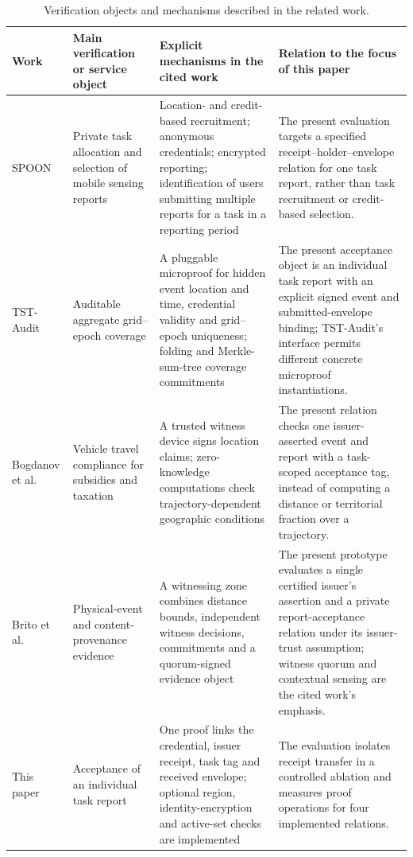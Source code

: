 \documentclass[pdflatex,iicol,sn-mathphys-num]{sn-jnl}
\begin{document}
\begin{table}[t]
\centering\small
\caption{Verification objects and mechanisms described in the related work.}\label{tab:comparison-context}
\begin{tabularx}{\textwidth}{@{}p{}p{}p{}X@{}}
\toprule
Work & Main verification or service object & Explicit mechanisms in the cited work & Relation to the focus of this paper \\\midrule
SPOON~\citep{Ni2020SPOON} & Private task allocation and selection of mobile sensing reports & Location- and credit-based recruitment; anonymous credentials; encrypted reporting; identification of users submitting multiple reports for a task in a reporting period & The present evaluation targets a specified receipt--holder--envelope relation for one task report, rather than task recruitment or credit-based selection. \\
TST-Audit~\citep{He2026TSTAudit} & Auditable aggregate grid--epoch coverage & A pluggable microproof for hidden event location and time, credential validity and grid--epoch uniqueness; folding and Merkle-sum-tree coverage commitments & The present acceptance object is an individual task report with an explicit signed event and submitted-envelope binding; TST-Audit's interface permits different concrete microproof instantiations. \\
Bogdanov et al.~\citep{Bogdanov2025VehiclePolicy} & Vehicle travel compliance for subsidies and taxation & A trusted witness device signs location claims; zero-knowledge computations check trajectory-dependent geographic conditions & The present relation checks one issuer-asserted event and report with a task-scoped acceptance tag, instead of computing a distance or territorial fraction over a trajectory. \\
Brito et al.~\citep{Brito2026ContentProvenance} & Physical-event and content-provenance evidence & A witnessing zone combines distance bounds, independent witness decisions, commitments and a quorum-signed evidence object & The present prototype evaluates a single certified issuer's assertion and a private report-acceptance relation under its issuer-trust assumption; witness quorum and contextual sensing are the cited work's emphasis. \\
This paper & Acceptance of an individual task report & One proof links the credential, issuer receipt, task tag and received envelope; optional region, identity-encryption and active-set checks are implemented & The evaluation isolates receipt transfer in a controlled ablation and measures proof operations for four implemented relations. \\
\bottomrule
\end{tabularx}
\end{table}
\end{document}
